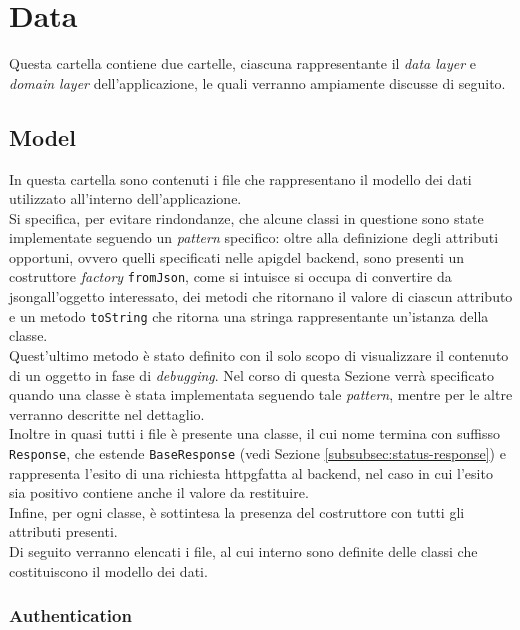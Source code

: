 \section{Data}
\label{sec:data}

Questa cartella contiene due cartelle, ciascuna rappresentante il \emph{data layer} e \emph{domain layer} dell'applicazione, le quali verranno ampiamente discusse di seguito.

\subsection{Model}
\label{subsec:model}

In questa cartella sono contenuti i file che rappresentano il modello dei dati utilizzato all'interno dell'applicazione.\\
Si specifica, per evitare rindondanze, che alcune classi in questione sono state implementate seguendo un \emph{pattern} specifico: oltre alla definizione degli attributi opportuni, ovvero quelli specificati nelle \gls{apig}\glsoccur del \gls{backend}\glsoccur, sono presenti un costruttore \emph{factory} \cite{site:factory} \lstinline{fromJson}, come si intuisce si occupa di convertire da \gls{jsong}\glsoccur all'oggetto interessato, dei metodi che ritornano il valore di ciascun attributo e un metodo \lstinline{toString} che ritorna una stringa rappresentante un'istanza della classe.\\
Quest'ultimo metodo è stato definito con il solo scopo di visualizzare il contenuto di un oggetto in fase di \emph{debugging}.
Nel corso di questa Sezione verrà specificato quando una classe è stata implementata seguendo tale \emph{pattern}, mentre per le altre verranno descritte nel dettaglio. \\
Inoltre in quasi tutti i file è presente una classe, il cui nome termina con suffisso \lstinline{Response}, che estende \lstinline{BaseResponse} (vedi Sezione \ref{subsubsec:status-response}) e rappresenta l'esito di una richiesta \gls{httpg}\glsoccur fatta al \gls{backend}\glsoccur, nel caso in cui l'esito sia positivo contiene anche il valore da restituire.\\
Infine, per ogni classe, è sottintesa la presenza del costruttore con tutti gli attributi presenti.\\
Di seguito verranno elencati i file, al cui interno sono definite delle classi che costituiscono il modello dei dati.

\subsubsection*{Authentication}
\label{subsubsec:authentication}

